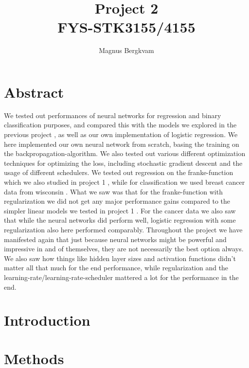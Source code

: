 \documentclass{article}
\title{Project 2 \\ FYS-STK3155/4155}
\author{Magnus Bergkvam}
\begin{document}
\maketitle


\section{Abstract}
We tested out performances of neural networks for regression and binary
classification purposes, and compared this with the models we explored in the
previous project \cite{githubrepoproject1}, as well as our own implementation of
logistic regression. We here implemented our own neural network from scratch,
basing the training on the backpropagation-algorithm. We also tested out various
different optimization techniques for optimizing the loss, including stochastic
gradient descent and the usage of different schedulers. We tested out regression
on the franke-function which we also studied in project 1
\cite{githubrepoproject1}, while for classification we used breast cancer data
from wisconsin \cite{sklearncancerdata} \cite{breastcancerwisconsin}. What we
saw was that for the franke-function with regularization we did not get any
major performance gains compared to the simpler linear models we tested in
project 1 \cite{githubrepoproject1}. For the cancer data we also saw that while
the neural networks did perform well, logistic regression with some
regularization also here performed comparably. Throughout the project we have
manifested again that just because neural networks might be powerful and
impressive in and of themselves, they are not necessarily the best option
always. We also saw how things like hidden layer sizes and activation functions
didn't matter all that much for the end performance, while regularization and
the learning-rate/learning-rate-scheduler mattered a lot for the performance in
the end.

\section{Introduction}

\section{Methods}
\end{document}
